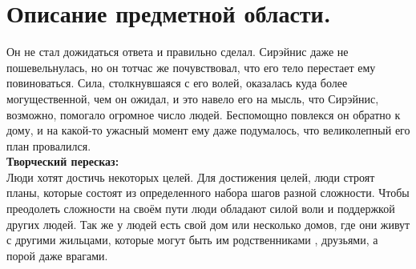 \documentclass[12pt,onecolumn]{article}
\begin{document}
\section{Описание предметной области.}
Он не стал дожидаться ответа и правильно сделал. Сирэйнис даже не пошевельнулась, но он тотчас же почувствовал, что его тело перестает ему повиноваться. Сила, столкнувшаяся с его волей, оказалась куда более могущественной, чем он ожидал, и это навело его на мысль, что Сирэйнис, возможно, помогало огромное число людей. Беспомощно повлекся он обратно к дому, и на какой-то ужасный момент ему даже подумалось, что великолепный его план провалился.\\
\textbf{Творческий пересказ:}\\
Люди хотят достичь некоторых целей. Для достижения целей, люди строят планы, которые состоят из определенного набора шагов разной сложности. Чтобы преодолеть сложности на своём пути люди обладают силой воли и поддержкой других людей. Так же у людей есть свой дом или несколько домов, где они живут с другими жильцами, которые могут быть им родственниками , друзьями, а порой даже врагами. 
\end{document}
